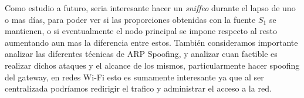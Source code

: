 Como estudio a futuro, seria interesante hacer un \textit{sniffeo} durante el lapso de uno o mas días, para poder ver si las proporciones obtenidas con la fuente $S_1$ se mantienen, o si eventualmente el nodo principal se impone respecto al resto aumentando aun mas la diferencia entre estos. También consideramos importante analizar las diferentes técnicas de ARP Spoofing, y analizar cuan factible es realizar dichos ataques y el alcance de los mismos, particularmente hacer spoofing del gateway, en redes Wi-Fi esto es sumamente interesante ya que al ser centralizada podríamos redirigir el trafico y administrar el acceso a la red.
%
%

